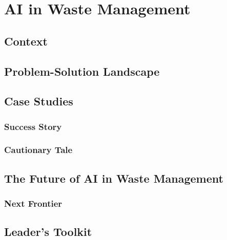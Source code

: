 \chapter{AI in Waste Management}
\label{chap:ai_in_waste_management}

\section{Context}
\label{sec:waste_context}

\section{Problem-Solution Landscape}
\label{sec:waste_problem_solution}

\section{Case Studies}
\label{sec:waste_case_studies}
\subsection{Success Story}
\label{sec:waste_success_story}
\subsection{Cautionary Tale}
\label{sec:waste_cautionary_tale}

\section{The Future of AI in Waste Management}
\label{sec:future_of_ai_in_waste}
\subsection{Next Frontier}
\label{sec:waste_next_frontier}

\section{Leader's Toolkit}
\label{sec:waste_leaders_toolkit}